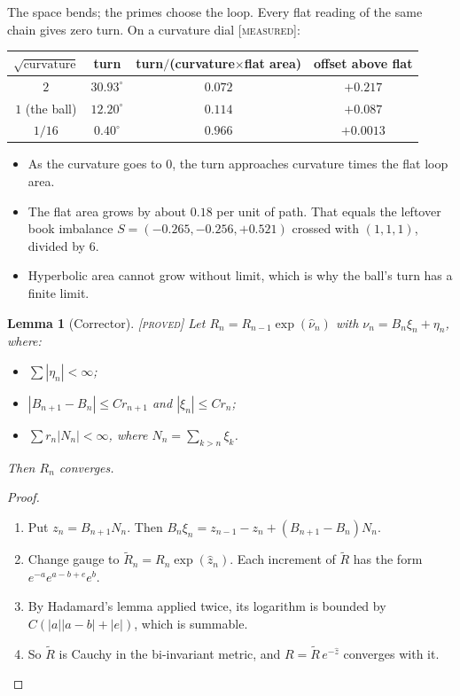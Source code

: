 \documentclass[11pt]{article}
\newtheorem{lemma}{Lemma}
\theoremstyle{definition}
\theoremstyle{remark}
\newcommand{\grade}[1]{\textsc{[#1]}}
\begin{document}
\noindent The space bends; the primes choose the loop. Every flat reading of the same chain gives zero turn. On a curvature dial \grade{measured}:

\begin{center}
\begin{tabular}{cccc}
\toprule
$\sqrt{\text{curvature}}$ & turn & turn$/$(curvature$\times$flat area) & offset above flat\\
\midrule
$2$ & $30.93^\circ$ & $0.072$ & $+0.217$\\
$1$ (the ball) & $12.20^\circ$ & $0.114$ & $+0.087$\\
$1/16$ & $0.40^\circ$ & $0.966$ & $+0.0013$\\
\bottomrule
\end{tabular}
\end{center}

\begin{itemize}
\item As the curvature goes to $0$, the turn approaches curvature times the flat loop area.
\item The flat area grows by about $0.18$ per unit of path. That equals the leftover book imbalance $S=(-0.265,-0.256,+0.521)$ crossed with $(1,1,1)$, divided by $6$.
\item Hyperbolic area cannot grow without limit, which is why the ball's turn has a finite limit.
\end{itemize}

\begin{lemma}[Corrector] \grade{proved}
Let $R_n=R_{n-1}\exp(\hat\nu_n)$ with $\nu_n=B_n\xi_n+\eta_n$, where:
\begin{itemize}
\item $\sum|\eta_n|<\infty$;
\item $|B_{n+1}-B_n|\le Cr_{n+1}$ and $|\xi_n|\le Cr_n$;
\item $\sum r_n|N_n|<\infty$, where $N_n=\sum_{k>n}\xi_k$.
\end{itemize}
Then $R_n$ converges.
\end{lemma}
\begin{proof}
\begin{enumerate}
\item Put $z_n=B_{n+1}N_n$. Then $B_n\xi_n=z_{n-1}-z_n+(B_{n+1}-B_n)N_n$.
\item Change gauge to $\tilde R_n=R_n\exp(\hat z_n)$. Each increment of $\tilde R$ has the form $e^{-a}e^{a-b+e}e^{b}$.
\item By Hadamard's lemma applied twice, its logarithm is bounded by $C(|a||a-b|+|e|)$, which is summable.
\item So $\tilde R$ is Cauchy in the bi-invariant metric, and $R=\tilde R\,e^{-\hat z}$ converges with it.
\end{enumerate}
\end{proof}
\end{document}
